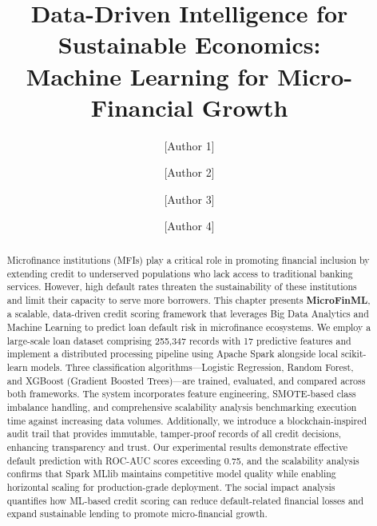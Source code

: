 \documentclass[runningheads]{llncs}
\begin{document}

\title{Data-Driven Intelligence for Sustainable Economics:\\Machine Learning for Micro-Financial Growth}

\author{[Author 1] \and [Author 2] \and [Author 3] \and [Author 4]}


\maketitle

\begin{abstract}
Microfinance institutions (MFIs) play a critical role in promoting financial inclusion by extending credit to underserved populations who lack access to traditional banking services. However, high default rates threaten the sustainability of these institutions and limit their capacity to serve more borrowers. This chapter presents \textbf{MicroFinML}, a scalable, data-driven credit scoring framework that leverages Big Data Analytics and Machine Learning to predict loan default risk in microfinance ecosystems. We employ a large-scale loan dataset comprising 255,347 records with 17 predictive features and implement a distributed processing pipeline using Apache Spark alongside local scikit-learn models. Three classification algorithms---Logistic Regression, Random Forest, and XGBoost (Gradient Boosted Trees)---are trained, evaluated, and compared across both frameworks. The system incorporates feature engineering, SMOTE-based class imbalance handling, and comprehensive scalability analysis benchmarking execution time against increasing data volumes. Additionally, we introduce a blockchain-inspired audit trail that provides immutable, tamper-proof records of all credit decisions, enhancing transparency and trust. Our experimental results demonstrate effective default prediction with ROC-AUC scores exceeding 0.75, and the scalability analysis confirms that Spark MLlib maintains competitive model quality while enabling horizontal scaling for production-grade deployment. The social impact analysis quantifies how ML-based credit scoring can reduce default-related financial losses and expand sustainable lending to promote micro-financial growth.

\end{abstract}
\end{document}
